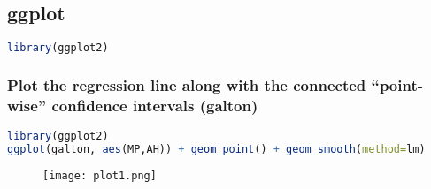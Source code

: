 \documentclass[11pt,a4paper]{article}
\begin{document}
\subsection{ggplot}
\begin{lstlisting}[language=R]
library(ggplot2)
\end{lstlisting}
\subsubsection{Plot the regression line along with the connected “point-wise” confidence intervals (galton)}
\begin{lstlisting}[language=R]
library(ggplot2)
ggplot(galton, aes(MP,AH)) + geom_point() + geom_smooth(method=lm)
\end{lstlisting}
\begin{center}\begin{figure}[htbp]
    \centering
    \texttt{[image: plot1.png]}
    \caption{}
    \label{}
\end{figure}\end{center}
\end{document}
